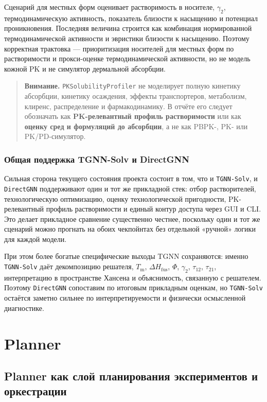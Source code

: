 \documentclass[11pt]{article}
\newcommand{\warnnote}[1]{\begin{quote}\textbf{Внимание.} #1\end{quote}}
\begin{document}
Сценарий для местных форм оценивает растворимость в носителе, \(\gamma_2\), термодинамическую активность, показатель близости к насыщению и потенциал проникновения. Последняя величина строится как комбинация нормированной термодинамической активности и эвристики близости к насыщению. Поэтому корректная трактовка --- приоритизация носителей для местных форм по растворимости и прокси-оценке термодинамической активности, но не модель кожной PK и не симулятор дермальной абсорбции.

\warnnote{\texttt{PKSolubilityProfiler} не моделирует полную кинетику абсорбции, кинетику осаждения, эффекты транспортеров, метаболизм, клиренс, распределение и фармакодинамику. В отчёте его следует обозначать как \textbf{PK-релевантный профиль растворимости} или как \textbf{оценку сред и формуляций до абсорбции}, а не как PBPK-, PK- или PK/PD-симулятор.}

\subsubsection{Общая поддержка TGNN-Solv и DirectGNN}

Сильная сторона текущего состояния проекта состоит в том, что и \texttt{TGNN-Solv}, и \texttt{DirectGNN} поддерживают один и тот же прикладной стек: отбор растворителей, технологическую оптимизацию, оценку технологической пригодности, PK-релевантный профиль растворимости и единый контур доступа через GUI и CLI. Это делает прикладное сравнение существенно честнее, поскольку один и тот же сценарий можно прогнать на обоих чекпойнтах без отдельной «ручной» логики для каждой модели.

При этом более богатые специфические выходы TGNN сохраняются: именно \texttt{TGNN-Solv} даёт декомпозицию решателя, \(T_{\mathrm{m}}\), \(\Delta H_{\mathrm{fus}}\), \(\Phi\), \(\gamma_2\), \(\tau_{12}\), \(\tau_{21}\), интерпретацию в пространстве Хансена и объяснимость, связанную с решателем. Поэтому \texttt{DirectGNN} сопоставим по итоговым прикладным оценкам, но \texttt{TGNN-Solv} остаётся заметно сильнее по интерпретируемости и физически осмысленной диагностике.

\section{Planner}

\subsection{Planner как слой планирования экспериментов и оркестрации}
\end{document}
